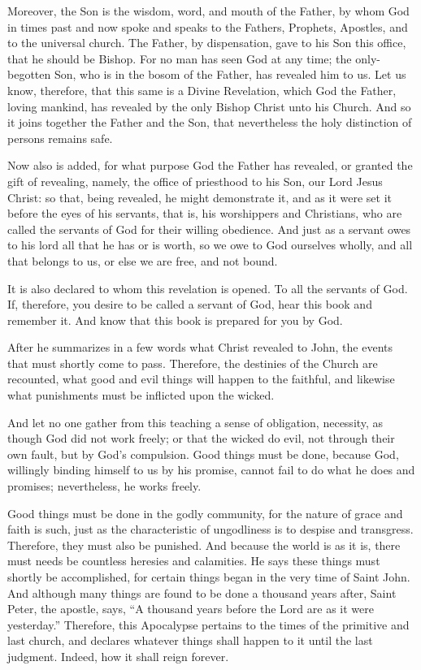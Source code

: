 Moreover, the Son is the wisdom, word, and mouth of the Father, by whom God in times past and now spoke and speaks to the Fathers, Prophets, Apostles, and to the universal church. The Father, by dispensation, gave to his Son this office, that he should be Bishop. For no man has seen God at any time; the only-begotten Son, who is in the bosom of the Father, has revealed him to us. Let us know, therefore, that this same is a Divine Revelation, which God the Father, loving mankind, has revealed by the only Bishop Christ unto his Church. And so it joins together the Father and the Son, that nevertheless the holy distinction of persons remains safe.

Now also is added, for what purpose God the Father has revealed, or granted the gift of revealing, namely, the office of priesthood to his Son, our Lord Jesus Christ: so that, being revealed, he might demonstrate it, and as it were set it before the eyes of his servants, that is, his worshippers and Christians, who are called the servants of God for their willing obedience. And just as a servant owes to his lord all that he has or is worth, so we owe to God ourselves wholly, and all that belongs to us, or else we are free, and not bound.

It is also declared to whom this revelation is opened. To all the servants of God. If, therefore, you desire to be called a servant of God, hear this book and remember it. And know that this book is prepared for you by God.

After he summarizes in a few words what Christ revealed to John, the events that must shortly come to pass. Therefore, the destinies of the Church are recounted, what good and evil things will happen to the faithful, and likewise what punishments must be inflicted upon the wicked.

And let no one gather from this teaching a sense of obligation, necessity, as though God did not work freely; or that the wicked do evil, not through their own fault, but by God’s compulsion. Good things must be done, because God, willingly binding himself to us by his promise, cannot fail to do what he does and promises; nevertheless, he works freely.

Good things must be done in the godly community, for the nature of grace and faith is such, just as the characteristic of ungodliness is to despise and transgress. Therefore, they must also be punished. And because the world is as it is, there must needs be countless heresies and calamities. He says these things must shortly be accomplished, for certain things began in the very time of Saint John. And although many things are found to be done a thousand years after, Saint Peter, the apostle, says, “A thousand years before the Lord are as it were yesterday.” Therefore, this Apocalypse pertains to the times of the primitive and last church, and declares whatever things shall happen to it until the last judgment. Indeed, how it shall reign forever.

